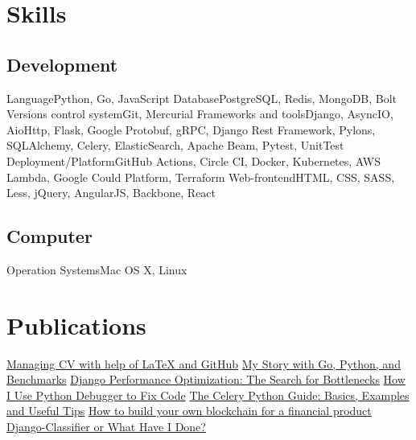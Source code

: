 \documentclass[11pt,a4paper,oneside]{moderncv}
\begin{document}
    \maketitle

    \section{Skills}
        \subsection{Development}
            \cvline
                {Language}{Python, Go, JavaScript}
            \cvline
                {Database}{PostgreSQL, Redis, MongoDB, Bolt}
            \cvline
                {Versions control system}{Git, Mercurial}
            \cvline
                {Frameworks and tools}{Django, AsyncIO, AioHttp, Flask, Google Protobuf, gRPC, Django Rest Framework, Pylons, SQLAlchemy, Celery, ElasticSearch, Apache Beam, Pytest, UnitTest}
            \cvline
                {Deployment/Platform}{GitHub Actions, Circle CI, Docker, Kubernetes, AWS Lambda, Google Could Platform, Terraform}
            \cvline
                {Web-frontend}{HTML, CSS, SASS, Less, jQuery, AngularJS, Backbone, React}

        \subsection{Computer}
            \cvline
                {Operation Systems}{Mac OS X, Linux}

    \section{Publications}
        \cvlistitem
            {\href{https://zakovinko.medium.com/managing-cv-with-help-of-latex-and-github-b51d46727a1d}{Managing CV with help of LaTeX and GitHub}}
        \cvlistitem
            {\href{https://djangostars.com/blog/my-story-with-golang/}{My Story with Go, Python, and Benchmarks}}
        \cvlistitem
            {\href{https://medium.com/free-code-camp/django-performance-optimization-looking-for-the-bottlenecks-8583789e341b}{Django Performance Optimization: The Search for Bottlenecks}}
        \cvlistitem
            {\href{https://codeburst.io/how-i-use-python-debugger-to-fix-code-279f11f75866}{How I Use Python Debugger to Fix Code}}
        \cvlistitem
            {\href{https://codeburst.io/the-celery-python-guide-basics-examples-and-useful-tips-d8da1fcfaea3}{The Celery Python Guide: Basics, Examples and Useful Tips}}
        \cvlistitem
            {\href{https://djangostars.com/blog/how-to-build-your-own-blockchain-for-a-financial-product/}{How to build your own blockchain for a financial product}}
        \cvlistitem
            {\href{https://medium.com/free-code-camp/django-classifier-or-what-have-i-done-4a8164358c09}{Django-Classifier or What Have I Done?}}
\end{document}
